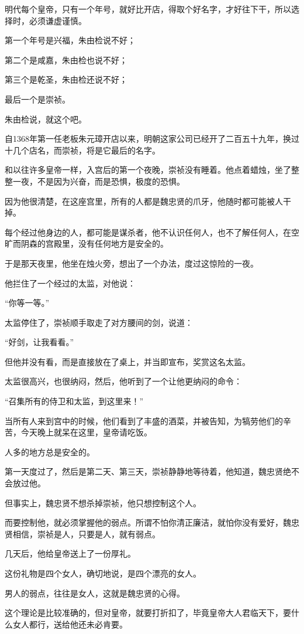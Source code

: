 \begin{multicols}{\theparacolNo}
		明代每个皇帝，只有一个年号，就好比开店，得取个好名字，才好往下干，所以选择时，必须谦虚谨慎。

		第一个年号是兴福，朱由检说不好；

		第二个是咸嘉，朱由检也说不好；

		第三个是乾圣，朱由检还说不好；

		最后一个是崇祯。

		朱由检说，就这个吧。

		自1368年第一任老板朱元璋开店以来，明朝这家公司已经开了二百五十九年，换过十几个店名，而崇祯，将是它最后的名字。

		和以往许多皇帝一样，入宫后的第一个夜晚，崇祯没有睡着。他点着蜡烛，坐了整整一夜，不是因为兴奋，而是恐惧，极度的恐惧。

		因为他很清楚，在这座宫里，所有的人都是魏忠贤的爪牙，他随时都可能被人干掉。

		每个经过他身边的人，都可能是谋杀者，他不认识任何人，也不了解任何人，在空旷而阴森的宫殿里，没有任何地方是安全的。

		于是那天夜里，他坐在烛火旁，想出了一个办法，度过这惊险的一夜。

		他拦住了一个经过的太监，对他说：

		“你等一等。”

		太监停住了，崇祯顺手取走了对方腰间的剑，说道：

		“好剑，让我看看。”

		但他并没有看，而是直接放在了桌上，并当即宣布，奖赏这名太监。

		太监很高兴，也很纳闷，然后，他听到了一个让他更纳闷的命令：

		“召集所有的侍卫和太监，到这里来！”

		当所有人来到宫中的时候，他们看到了丰盛的酒菜，并被告知，为犒劳他们的辛苦，今天晚上就呆在这里，皇帝请吃饭。

		人多的地方总是安全的。

		第一天度过了，然后是第二天、第三天，崇祯静静地等待着，他知道，魏忠贤绝不会放过他。

		但事实上，魏忠贤不想杀掉崇祯，他只想控制这个人。

		而要控制他，就必须掌握他的弱点。所谓不怕你清正廉洁，就怕你没有爱好，魏忠贤相信，崇祯是人，只要是人，就有弱点。

		几天后，他给皇帝送上了一份厚礼。

		这份礼物是四个女人，确切地说，是四个漂亮的女人。

		男人的弱点，往往是女人，这就是魏忠贤的心得。

		这个理论是比较准确的，但对皇帝，就要打折扣了，毕竟皇帝大人君临天下，要什么女人都行，送给他还未必肯要。


\end{multicols}
